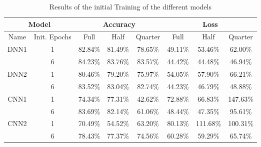 \begin{table}[htbp]
    \centering
    \caption{Results of the initial Training of the different models}
    \begin{tabular}{|cc|ccc|ccc|}
        \hline
        \multicolumn{2}{|c|}{Model} & \multicolumn{3}{c|}{Accuracy} & \multicolumn{3}{c|}{Loss} \\ \hline
        \multicolumn{1}{|c|}{Name}                  & Init. Epochs & \multicolumn{1}{c|}{Full}    & \multicolumn{1}{c|}{Half}    & Quarter & \multicolumn{1}{c|}{Full}    & \multicolumn{1}{c|}{Half}     & Quarter  \\ \hline
        \multicolumn{1}{|c|}{\multirow{2}{*}{DNN1}} & 1              & \multicolumn{1}{c|}{82.84\%} & \multicolumn{1}{c|}{81.49\%} & 78.65\% & \multicolumn{1}{c|}{49.11\%} & \multicolumn{1}{c|}{53.46\%}  & 62.00\%  \\ \cline{2-8}
        \multicolumn{1}{|c|}{}                      & 6              & \multicolumn{1}{c|}{84.23\%} & \multicolumn{1}{c|}{83.76\%} & 83.57\% & \multicolumn{1}{c|}{44.42\%} & \multicolumn{1}{c|}{44.48\%}  & 46.94\%  \\ \hline
        \multicolumn{1}{|c|}{\multirow{2}{*}{DNN2}} & 1              & \multicolumn{1}{c|}{80.46\%} & \multicolumn{1}{c|}{79.20\%} & 75.97\% & \multicolumn{1}{c|}{54.05\%} & \multicolumn{1}{c|}{57.90\%}  & 66.21\%  \\ \cline{2-8}
        \multicolumn{1}{|c|}{}                      & 6              & \multicolumn{1}{c|}{83.52\%} & \multicolumn{1}{c|}{83.04\%} & 82.74\% & \multicolumn{1}{c|}{44.23\%} & \multicolumn{1}{c|}{46.79\%}  & 48.88\%  \\ \hline
        \multicolumn{1}{|c|}{\multirow{2}{*}{CNN1}} & 1              & \multicolumn{1}{c|}{74.34\%} & \multicolumn{1}{c|}{77.31\%} & 42.62\% & \multicolumn{1}{c|}{72.88\%} & \multicolumn{1}{c|}{66.83\%}  & 147.63\% \\ \cline{2-8}
        \multicolumn{1}{|c|}{}                      & 6              & \multicolumn{1}{c|}{83.69\%} & \multicolumn{1}{c|}{82.14\%} & 61.06\% & \multicolumn{1}{c|}{48.44\%} & \multicolumn{1}{c|}{47.35\%}  & 95.61\%  \\ \hline
        \multicolumn{1}{|c|}{\multirow{2}{*}{CNN2}} & 1              & \multicolumn{1}{c|}{70.49\%} & \multicolumn{1}{c|}{54.52\%} & 63.20\% & \multicolumn{1}{c|}{80.13\%} & \multicolumn{1}{c|}{111.68\%} & 100.31\% \\ \cline{2-8}
        \multicolumn{1}{|c|}{}                      & 6              & \multicolumn{1}{c|}{78.43\%} & \multicolumn{1}{c|}{77.37\%} & 74.56\% & \multicolumn{1}{c|}{60.28\%} & \multicolumn{1}{c|}{59.29\%}  & 65.74\%  \\ \hline
    \end{tabular}
    \label{tab:results}
\end{table}